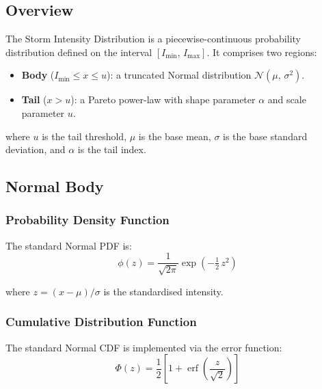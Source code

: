 \documentclass[11pt,a4paper]{article}
\begin{document}
\mkmframework

\subsection{Overview}

The Storm Intensity Distribution is a piecewise-continuous probability distribution
defined on the interval $[I_{\min},\, I_{\max}]$. It comprises two regions:

\begin{itemize}[nosep]
    \item \textbf{Body} ($I_{\min} \le x \le u$): a truncated Normal distribution
          $\mathcal{N}(\mu,\,\sigma^2)$.
    \item \textbf{Tail} ($x > u$): a Pareto power-law with shape parameter $\alpha$
          and scale parameter $u$.
\end{itemize}

\noindent where $u$ is the tail threshold, $\mu$ is the base mean, $\sigma$ is the
base standard deviation, and $\alpha$ is the tail index.

\subsection{Normal Body}

\subsubsection{Probability Density Function}

The standard Normal PDF is:
\begin{equation}
    \phi(z) = \frac{1}{\sqrt{2\pi}} \exp\!\left(-\tfrac{1}{2}\,z^2\right)
    \label{eq:normal_pdf}
\end{equation}

\noindent where $z = (x - \mu)/\sigma$ is the standardised intensity.

\subsubsection{Cumulative Distribution Function}

The standard Normal CDF is implemented via the error function:
\begin{equation}
    \Phi(z) = \frac{1}{2}\left[1 + \operatorname{erf}\!\left(\frac{z}{\sqrt{2}}\right)\right]
    \label{eq:normal_cdf}
\end{equation}
\end{document}
